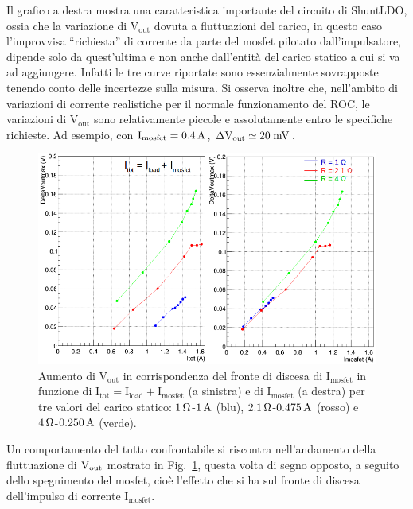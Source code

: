 Il grafico a destra mostra una caratteristica importante del circuito di ShuntLDO, ossia che la variazione di $\mathrm{V_{out}}$ dovuta a fluttuazioni del carico, in questo caso l'improvvisa ``richiesta'' di corrente da parte del mosfet pilotato dall'impulsatore, dipende solo da quest'ultima e non anche dall'entit\`a del carico statico a cui si va ad aggiungere. Infatti le tre curve riportate sono essenzialmente sovrapposte tenendo conto delle incertezze sulla misura.
Si osserva inoltre che, nell'ambito di variazioni di corrente realistiche per il normale funzionamento del ROC, le variazioni di $\mathrm{V_{out}}$ sono relativamente piccole e assolutamente entro le specifiche richieste. Ad esempio, con $\mathrm{I_{mosfet}= 0.4\rm \, A}$, $\mathrm{\Delta V_{out} \simeq 20\rm \; mV}$.

\begin{figure}
\centering
\includegraphics[width=0.9\linewidth]{Immagini/VoutOver}
\caption{Aumento di $\mathrm{V_{out}}$ in corrispondenza del fronte di discesa di $\mathrm{I_{mosfet}}$ in funzione di $\mathrm{I_{tot} = I_{load}+I_{mosfet}}$ (a sinistra) e di $\mathrm{I_{mosfet}}$ (a destra) per tre valori del carico statico: $1{\rm \, \Omega}$-$1\rm \, A$ (blu), $2.1{\rm \, \Omega}$-$0.475\rm \, A$ (rosso) e $4{\rm \, \Omega}$-$0.250\rm \, A$ (verde).}
\label{VoutOver}
\end{figure}

Un comportamento del tutto confrontabile si riscontra nell'andamento della fluttuazione di $\mathrm{V_{out}}$ mostrato in Fig.~\ref{VoutOver}, questa volta di segno opposto, a seguito dello spegnimento del mosfet, cioè l'effetto che si ha sul fronte di discesa dell'impulso di corrente $\mathrm{I_{mosfet}}$.

